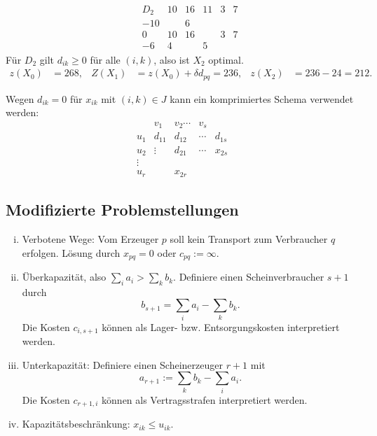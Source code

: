 \begin{exmp}
\begin{align*}
                      &
    &\begin{array}{r|ccccc}
      D_2 & 10 & 16 & 11 & 3 & 7  \\
      \hline
      -10 & & 6 & & & \\
      0 & 10 & 16 & & 3 & 7 \\
      -6  & 4 & & 5 & &
     \end{array}
  \end{align*}
  Für $D_2$ gilt $d_{ik} \ge 0$ für alle $(i,k)$, also ist $X_2$ optimal.
  \begin{align*}
    z(X_0) &= 268,
    & Z(X_1) &= z(X_0) + \delta d_{pq} = 236,
    & z(X_2) &= 236 - 24 = 212.
  \end{align*}
\end{exmp}

\begin{rmrk*}
  Wegen $d_{ik} = 0$ für $x_{ik}$ mit $(i,k) \in J$ kann ein komprimiertes
  Schema verwendet werden:
  \[
    \begin{array}{r|cccc}
      & v_1 & v_2 \cdots & v_s \\
      \hline
      u_1 & d_{11} & d_{12} & \cdots & d_{1s} \\
      u_2 & \vdots & d_{21} & \cdots & \boxed{x_{2s}} \\
      \vdots \\
      u_r & & \boxed{x_{2r}}
    \end{array}
  \]
\end{rmrk*}

\subsection{Modifizierte Problemstellungen} %
\begin{enumerate}[(i)]
\item Verbotene Wege: Vom Erzeuger $p$ soll kein Transport zum Verbraucher $q$
  erfolgen. Lösung durch $x_{pq} = 0$ oder $c_{pq} := \infty$.
\item Überkapazität, also $\sum_{i} a_i > \sum_k b_k$. Definiere einen
  Scheinverbraucher $s+1$ durch
  \[ b_{s+1} = \sum_i a_i - \sum_k b_k. \]
  Die Kosten $c_{i,s+1}$ können als Lager- bzw. Entsorgungskosten interpretiert
  werden.
\item Unterkapazität: Definiere einen Scheinerzeuger $r+1$ mit
  \[ a_{r+1} := \sum_k b_k - \sum_i a_i. \]
  Die Kosten $c_{r+1,i}$ können als Vertragsstrafen interpretiert werden.
\item Kapazitätsbeschränkung: $x_{ik} \le u_{ik}$. 
\end{enumerate}